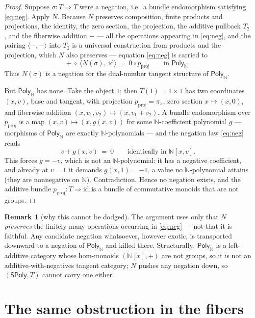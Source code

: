 \documentclass[11pt]{article}
\theoremstyle{definition}
\newtheorem{remark}[theorem]{Remark}
\newcommand{\SPoly}{\mathsf{SPoly}}
\newcommand{\PolyN}{\mathsf{Poly}_{\mathbb{N}}}
\newcommand{\N}{\mathbb{N}}
\newcommand{\id}{\mathrm{id}}
\begin{document}
\begin{proof}
Suppose $\sigma:T\Rightarrow T$ were a negation, i.e.\ a bundle endomorphism satisfying
\eqref{eq:neg}. Apply $N$. Because $N$ preserves composition, finite products and
projections, the identity, the zero section, the projection, the additive pullback $T_2$,
and the fiberwise addition $+$ --- all the operations appearing in \eqref{eq:neg}, and the
pairing $\langle-,-\rangle$ into $T_2$ is a universal construction from products and the
projection, which $N$ also preserves --- equation \eqref{eq:neg} is carried to
\[
   +\ \circ\ \langle N(\sigma),\ \id\rangle\ =\ 0\circ p_{\mathrm{proj}}
   \qquad\text{in } \PolyN .
\]
Thus $N(\sigma)$ is a negation for the dual-number tangent structure of $\PolyN$.

But $\PolyN$ has none. Take the object $1$; then $T(1)=1\times 1$ has two coordinates
$(x,v)$, base and tangent, with projection $p_{\mathrm{proj}}=\pi_x$, zero section $x\mapsto
(x,0)$, and fiberwise addition $(x,v_1,v_2)\mapsto(x,v_1+v_2)$. A bundle endomorphism over
$p_{\mathrm{proj}}$ is a map $(x,v)\mapsto(x,g(x,v))$ for some $\N$-coefficient polynomial
$g$ --- morphisms of $\PolyN$ are exactly $\N$-polynomials --- and the negation law
\eqref{eq:neg} reads
\[
   v + g(x,v)\ =\ 0 \qquad\text{identically in } \N[x,v].
\]
This forces $g=-v$, which is not an $\N$-polynomial: it has a negative coefficient, and
already at $v=1$ it demands $g(x,1)=-1$, a value no $\N$-polynomial attains (they are
nonnegative on $\N$). Contradiction. Hence no negation exists, and the additive bundle
$p_{\mathrm{proj}}:T\Rightarrow\id$ is a bundle of commutative monoids that are not groups.
\end{proof}

\begin{remark}[why this cannot be dodged]
The argument uses only that $N$ \emph{preserves} the finitely many operations occurring in
\eqref{eq:neg} --- not that it is faithful. Any candidate negation whatsoever, however
exotic, is transported downward to a negation of $\PolyN$ and killed there. Structurally:
$\PolyN$ is a left-additive category whose hom-monoids $(\N[x],+)$ are not groups, so it is
not an additive-with-negatives tangent category; $N$ pushes any negation down, so
$(\SPoly,T)$ cannot carry one either.
\end{remark}

\section{The same obstruction in the fibers}\label{sec:fibers}
\end{document}
